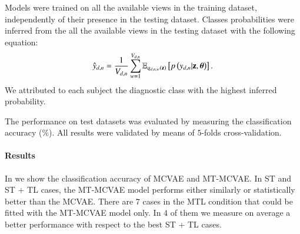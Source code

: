 Models were trained on all the available views in the training dataset, independently of their presence in the testing dataset.
Classes probabilities were inferred from the all the available views in the testing dataset with the following equation:
\begin{equation}\label{eq:reconstructiony}
\begin{aligned}
\hat{y}_{d,n} = \frac{1}{V_{d, n}} \sum_{w=1}^{V_{d, n}} \operatorname{\mathbb{E}}_{q_{d,n,w}(\mathbf{z})}\left[p\left(y_{d,n}|\mathbf{z},\boldsymbol{\theta}\right)\right].
\end{aligned}
\end{equation}
We attributed to each subject the diagnostic class with the highest inferred probability.

The performance on test datasets was evaluated by measuring the classification accuracy (\%).
All results were validated by means of $5$-folds cross-validation.

\paragraph{Results}
In  we show the classification accuracy of MCVAE and MT-MCVAE.
In ST and ST + TL cases, the MT-MCVAE model performs either similarly or statistically better than the MCVAE.
There are $7$ cases in the MTL condition  that could be fitted with the MT-MCVAE model only.
In $4$ of them we measure on average a better performance with respect to the best ST + TL cases.

